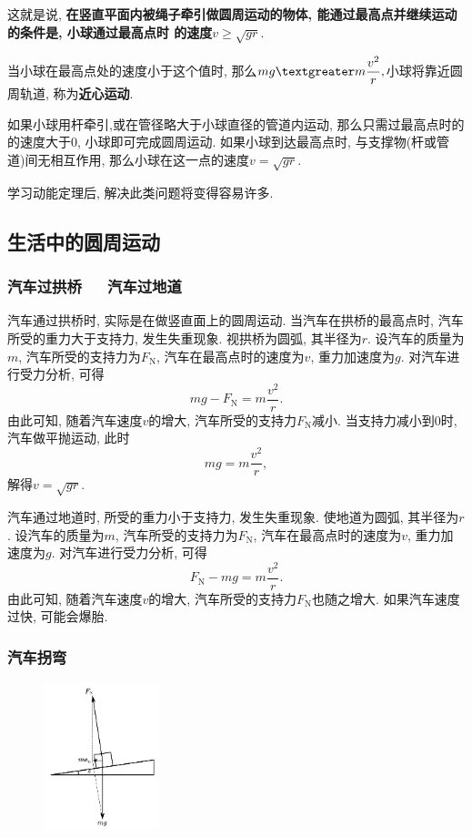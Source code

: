 \documentclass[11pt,a4paper]{ctexart}
\begin{document}
这就是说, \textbf{在竖直平面内被绳子牵引做圆周运动的物体, 能通过最高点并继续运动的条件是, 小球通过最高点时
	的速度$v \geqslant \sqrt{gr}.$}

当小球在最高点处的速度小于这个值时, 那么$mg \textgreater m\displaystyle\frac{v^2}{r}, $小球将靠近圆周轨道, 称为\textbf{近心运动}.

如果小球用杆牵引,或在管径略大于小球直径的管道内运动, 那么只需过最高点时的的速度大于0, 小球即可完成圆周运动.
如果小球到达最高点时, 与支撑物(杆或管道)间无相互作用, 那么小球在这一点的速度$v = \sqrt{gr}$.

学习动能定理后, 解决此类问题将变得容易许多.
\subsection{生活中的圆周运动}

\subsubsection{汽车过拱桥\ \ \ 汽车过地道}

汽车通过拱桥时, 实际是在做竖直面上的圆周运动. 当汽车在拱桥的最高点时, 汽车所受的重力大于支持力, 发生失重现象.
视拱桥为圆弧, 其半径为$r$.
设汽车的质量为$m$, 汽车所受的支持力为$F_\mathrm{N}$, 汽车在最高点时的速度为$v$, 重力加速度为$g$.
对汽车进行受力分析, 可得$$mg - F_\mathrm{N} = m\frac{v^2}{r}.$$
由此可知, 随着汽车速度$v$的增大, 汽车所受的支持力$F_\mathrm{N}$减小. 当支持力减小到0时, 汽车做平抛运动,
此时$$mg = m\frac{v^2}{r},$$ 解得$v = \sqrt{gr}.$

汽车通过地道时, 所受的重力小于支持力, 发生失重现象. 使地道为圆弧, 其半径为$r$.
设汽车的质量为$m$, 汽车所受的支持力为$F_\mathrm{N}$, 汽车在最高点时的速度为$v$, 重力加速度为$g$.
对汽车进行受力分析, 可得$$F_\mathrm{N} - mg = m\frac{v^2}{r}.$$
由此可知, 随着汽车速度$v$的增大, 汽车所受的支持力$F_\mathrm{N}$也随之增大. 如果汽车速度过快, 可能会爆胎.

\subsubsection{汽车拐弯}

\begin{figure}
	\flushright
	\includegraphics[width=0.3\textwidth]{pic/pic12.pdf}
	\label{fig12}
\end{figure}
\end{document}

